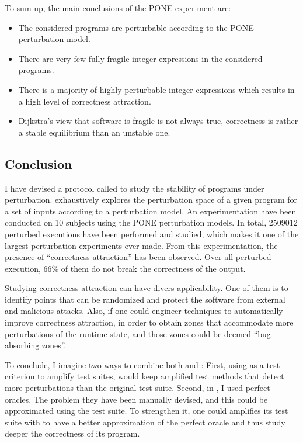 \begin{mdframed}
To sum up, the main conclusions of the PONE experiment are:
\begin{itemize}
	\item The considered programs are perturbable according to the PONE perturbation model.
	\item There are very few fully fragile integer expressions in the considered programs.
	\item There is a majority of highly perturbable integer expressions which results in a high level of correctness attraction.
	\item Dijkstra's view that software is fragile is not always true, correctness is rather a stable equilibrium than an unstable one.
\end{itemize}
\end{mdframed}

\subsection{Conclusion}
\label{subsec:transversal-contributions:correctness:conclusion}

I have devised a protocol called \perturb to study the stability of programs under perturbation.
\perturb exhaustively explores the perturbation space of a given program for a set of inputs according to a perturbation model.
An experimentation have been conducted on 10 subjects using the PONE perturbation models.
In total, 2509012 perturbed executions have been performed and studied, which makes it one of the largest perturbation experiments ever made.
From this experimentation, the presence of ``correctness attraction'' has been observed. Over all perturbed execution, 66\% of them do not break the correctness of the output. 

Studying correctness attraction can have divers applicability.
One of them is to identify points that can be randomized and protect the software from external and malicious attacks.
Also, if one could engineer techniques to automatically improve correctness attraction, in order to obtain zones that accommodate more perturbations of the runtime state, and those zones could be deemed ``bug absorbing zones''.

To conclude, I imagine two ways to combine both \dspot and \perturb:
First, using \perturb as a test-criterion to amplify test suites, \ie \dspot would keep amplified test methods that detect more perturbations than the original test suite.
Second, in \perturb, I used perfect oracles.
The problem they have been manually devised, and this could be approximated using the test suite.
To strengthen it, one could amplifies its test suite with \dspot to have a better approximation of the perfect oracle and thus study deeper the correctness of its program.

